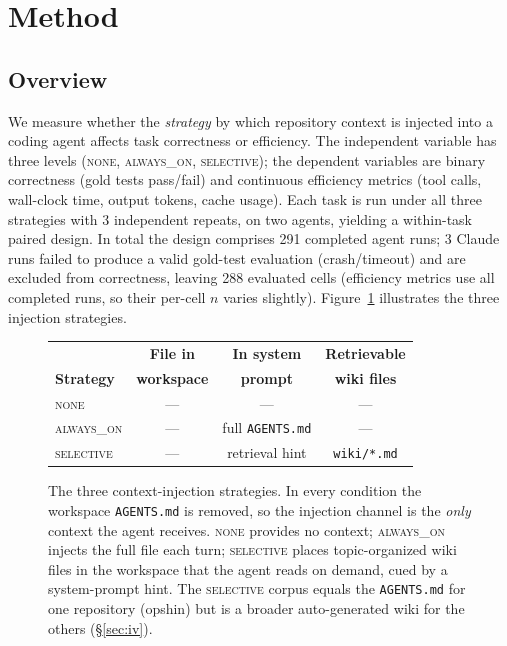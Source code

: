 \documentclass[11pt]{article}
\newcommand{\agentsmd}{\texttt{AGENTS.md}}
\newcommand{\none}{\textsc{none}}
\newcommand{\alwayson}{\textsc{always\_on}}
\newcommand{\selective}{\textsc{selective}}
\begin{document}
\section{Method}

\subsection{Overview}

We measure whether the \emph{strategy} by which repository context is injected into a coding agent affects task correctness or efficiency.
The independent variable has three levels (\none{}, \alwayson{}, \selective{}); the dependent variables are binary correctness (gold tests pass/fail) and continuous efficiency metrics (tool calls, wall-clock time, output tokens, cache usage).
Each task is run under all three strategies with 3 independent repeats, on two agents, yielding a within-task paired design.
In total the design comprises 291 completed agent runs; 3 Claude runs failed to produce a valid gold-test evaluation (crash/timeout) and are excluded from correctness, leaving 288 evaluated cells (efficiency metrics use all completed runs, so their per-cell $n$ varies slightly).
Figure~\ref{fig:strategies} illustrates the three injection strategies.

\begin{figure}[t]
\centering
\small
\setlength{\tabcolsep}{4pt}
\renewcommand{\arraystretch}{1.25}
\begin{tabular}{@{}lccc@{}}
\toprule
& \textbf{File in} & \textbf{In system} & \textbf{Retrievable} \\
\textbf{Strategy} & \textbf{workspace} & \textbf{prompt} & \textbf{wiki files} \\
\midrule
\none      & --- & --- & --- \\
\alwayson  & --- & full \agentsmd{} & --- \\
\selective & --- & retrieval hint & \texttt{wiki/*.md} \\
\bottomrule
\end{tabular}
\caption{The three context-injection strategies. In every condition the workspace \agentsmd{} is removed, so the injection channel is the \emph{only} context the agent receives. \none{} provides no context; \alwayson{} injects the full file each turn; \selective{} places topic-organized wiki files in the workspace that the agent reads on demand, cued by a system-prompt hint. The \selective{} corpus equals the \agentsmd{} for one repository (opshin) but is a broader auto-generated wiki for the others (\S\ref{sec:iv}).}
\label{fig:strategies}
\end{figure}
\end{document}
